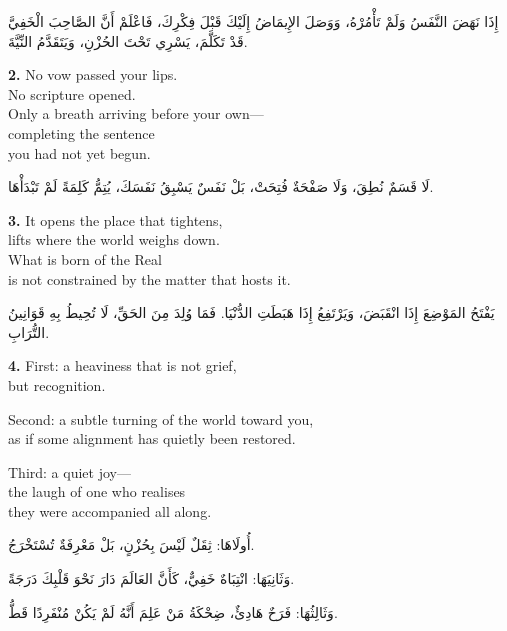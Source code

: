 \documentclass[11pt,a4paper,twoside]{book}
\begin{document}
\begin{flushright}
{\arabicfont
إِذَا نَهَضَ النَّفَسُ وَلَمْ تَأْمُرْهُ،
وَوَصَلَ الإِيمَاضُ إِلَيْكَ قَبْلَ فِكْرِكَ،
فَاعْلَمْ أَنَّ الصَّاحِبَ الْخَفِيَّ قَدْ تَكَلَّمَ،
يَسْرِي تَحْتَ الحُزْنِ، وَيَتَقَدَّمُ النِّيَّةَ.}
\end{flushright}

\vspace{1em}
{\color{indigo}\bfseries 2.}\quad
No vow passed your lips.\\
No scripture opened.\\
Only a breath arriving before your own—\\
completing the sentence\\
you had not yet begun.

\begin{flushright}
{\arabicfont
لَا قَسَمٌ نُطِقَ،
وَلَا صَفْحَةٌ فُتِحَتْ،
بَلْ نَفَسٌ يَسْبِقُ نَفَسَكَ،
يُتِمُّ كَلِمَةً لَمْ تَبْدَأْهَا.}
\end{flushright}

\vspace{1em}
{\color{indigo}\bfseries 3.}\quad
It opens the place that tightens,\\
lifts where the world weighs down.\\
What is born of the Real\\
is not constrained by the matter that hosts it.

\begin{flushright}
{\arabicfont
يَفْتَحُ المَوْضِعَ إِذَا انْقَبَضَ،
وَيَرْتَفِعُ إِذَا هَبَطَتِ الدُّنْيَا.
فَمَا وُلِدَ مِنَ الحَقِّ،
لَا تُحِيطُ بِهِ قَوَانِينُ التُّرَابِ.}
\end{flushright}

\vspace{1em}
{\color{indigo}\bfseries 4.}\quad
First: a heaviness that is not grief,\\
but recognition.

Second: a subtle turning of the world toward you,\\
as if some alignment has quietly been restored.

Third: a quiet joy—\\
the laugh of one who realises\\
they were accompanied all along.

\begin{flushright}
{\arabicfont
أُولَاهَا: ثِقَلٌ لَيْسَ بِحُزْنٍ،
بَلْ مَعْرِفَةٌ تُسْتَخْرَجُ.

وَثَانِيَهَا: انْتِبَاهٌ خَفِيٌّ،
كَأَنَّ العَالَمَ دَارَ نَحْوَ قَلْبِكَ دَرَجَةً.

وَثَالِثُهَا: فَرَحٌ هَادِئٌ،
ضِحْكَةُ مَنْ عَلِمَ أَنَّهُ لَمْ يَكُنْ مُنْفَرِدًا قَطُّ.}
\end{flushright}
\end{document}
